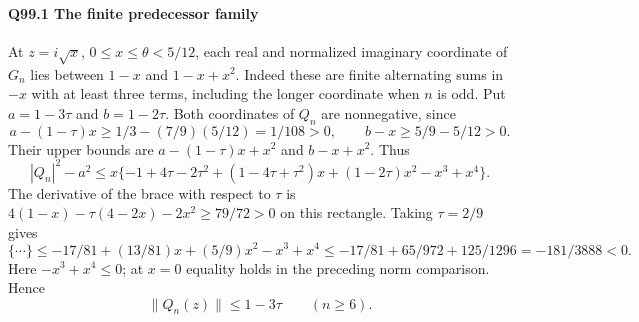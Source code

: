 \paragraph{Q99.1 The finite predecessor family}\label{part:Q99.1}
At $z=\allowbreak i\sqrt{x}$, $0\le\allowbreak  x\le\allowbreak \theta<\allowbreak 5/12$, each real and normalized
imaginary coordinate of $G_n$ lies between $1-x$ and $1-x+x^2$.
Indeed these are finite alternating sums in $-x$ with at least three
terms, including the longer coordinate when $n$ is odd.
Put $a=\allowbreak 1-3\tau$ and $b=\allowbreak 1-2\tau$. Both coordinates of $Q_n$ are
nonnegative, since
\[
 a-(1-\tau)x\ge1/3-(7/9)(5/12)=1/108>0,\qquad
 b-x\ge5/9-5/12>0.
\]
Their upper bounds are $a-(1-\tau)x+x^2$ and $b-x+x^2$.
Thus
\[
 |Q_n|^2-a^2\le x\{-1+4\tau-2\tau^2
 +(1-4\tau+\tau^2)x+(1-2\tau)x^2-x^3+x^4\}.
\]
The derivative of the brace with respect to $\tau$ is
$4(1-x)-\tau(4-2x)-2x^2\ge\allowbreak 79/72>\allowbreak 0$ on this rectangle.
Taking $\tau=\allowbreak 2/9$ gives
\[
 \{\cdots\}\le-17/81+(13/81)x+(5/9)x^2-x^3+x^4
 \le-17/81+65/972+125/1296=-181/3888<0.
\]
Here $-x^3+x^4\le\allowbreak 0$; at $x=\allowbreak 0$ equality holds in the preceding
norm comparison. Hence
\begin{equation}\tag{Q99.1.1}\label{eq:Q99:predecessor}
 \|Q_n(z)\|\le1-3\tau\qquad(n\ge6).
\end{equation}

